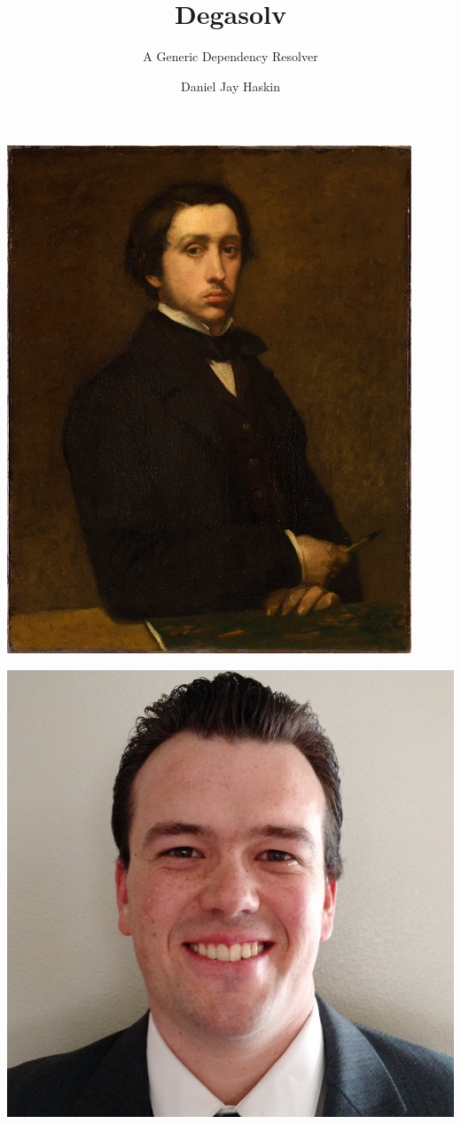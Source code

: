 \documentclass{beamer}
\title{Degasolv}
\subtitle{A Generic Dependency Resolver}
\author{Daniel Jay Haskin}
\begin{document}
\begin{frame}
  \titlepage
\end{frame}
\begin{frame}
  \centerline{\includegraphics[scale=0.5]{Edgar_Degas_self_portrait_1855.jpeg}}
\end{frame}
\begin{frame}
  \centerline{\includegraphics[scale=0.15]{DanielHaskin-small.jpg}}
\end{frame}
\end{document}
